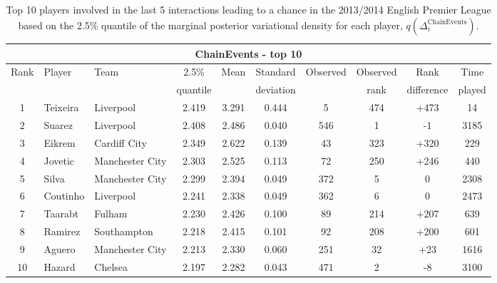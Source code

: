 \documentclass[11pt,a4paper]{article}
\begin{document}
\begin{table}%
\caption{Top 10 players involved in the last 5 interactions leading to a chance in the 2013/2014 English Premier League based on the 2.5\% quantile of the marginal posterior variational density for each player, $q(\Delta_i^{\textrm{ChainEvents}})$.} \label{tablechain}
\centering
\footnotesize
\begin{tabular}{cllccccccc}
\hline
\multicolumn{10}{c}{ChainEvents - top 10}\\
\hline
\multirow{2}{*}{Rank} & \multirow{2}{*}{Player} &  \multirow{2}{*}{Team} & 2.5\% & \multirow{2}{*}{Mean} & Standard & \multirow{2}{*}{Observed} & Observed & Rank & Time\\
 &  &  & quantile & & deviation &  & rank & difference & played \\
\hline
1 & Teixeira & Liverpool &	2.419 &	3.291 &	0.444 &	5 & 474 & +473 &	14\\
2 & Suarez & Liverpool &	2.408 &	2.486 &	0.040 &	546  & 1 & -1 &	3185\\
3 & Eikrem & Cardiff City	& 	2.349 &	2.622 &	0.139 &	43 & 323 & +320 & 	229\\
4 & Jovetic & Manchester City &	2.303 &	2.525 &	0.113 &	72  & 250 & +246 &	440\\
5 & Silva 	& Manchester City &	2.299 &	2.394 &	0.049 &	372  & 5 & 0 &	2308\\
6 & Coutinho 	& Liverpool &	2.241 &	2.338 &	0.049 &	362  & 6 & 0 &	2473\\
7 & Taarabt 	& Fulham &	2.230 &	2.426 &	0.100 &	89  & 214 & +207 &	639\\
8 & Ramirez & Southampton &	2.218 &	2.415 &	0.101 &	92  & 208 & +200 &	601\\
9 & Aguero & Manchester City	& 	2.213 &	2.330 &	0.060 &	251  & 32 & +23 &	1616\\
10 & Hazard &	Chelsea & 	2.197 &	2.282 & 	0.043 & 	471  & 2 & -8 &	3100\\
\hline
\end{tabular}
\end{table}
\end{document}
